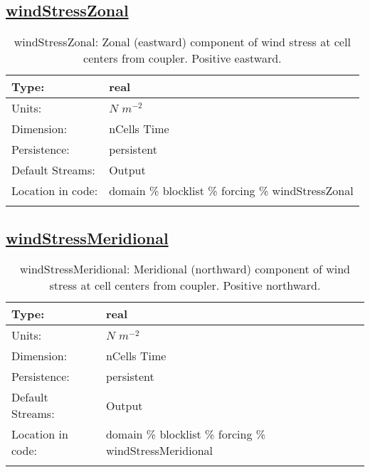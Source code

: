 \subsection[windStressZonal]{\hyperref[sec:var_tab_forcing]{windStressZonal}}
\label{subsec:var_sec_forcing_windStressZonal}
\begin{center}
\begin{longtable}{| p{2.0in} | p{4.0in} |}
        \hline 
        Type: & real \\
        \hline 
        Units: & $N$ $m^{-2}$ \\
        \hline 
        Dimension: & nCells Time \\
        \hline 
        Persistence: & persistent \\
        \hline 
		 Default Streams: & Output  \\
        \hline 
		 Location in code: & domain \% blocklist \% forcing \% windStressZonal \\
		 \hline 
    \caption{windStressZonal: Zonal (eastward) component of wind stress at cell centers from coupler. Positive eastward.}
\end{longtable}
\end{center}
\subsection[windStressMeridional]{\hyperref[sec:var_tab_forcing]{windStressMeridional}}
\label{subsec:var_sec_forcing_windStressMeridional}
\begin{center}
\begin{longtable}{| p{2.0in} | p{4.0in} |}
        \hline 
        Type: & real \\
        \hline 
        Units: & $N$ $m^{-2}$ \\
        \hline 
        Dimension: & nCells Time \\
        \hline 
        Persistence: & persistent \\
        \hline 
		 Default Streams: & Output  \\
        \hline 
		 Location in code: & domain \% blocklist \% forcing \% windStressMeridional \\
		 \hline 
    \caption{windStressMeridional: Meridional (northward) component of wind stress at cell centers from coupler. Positive northward.}
\end{longtable}
\end{center}

